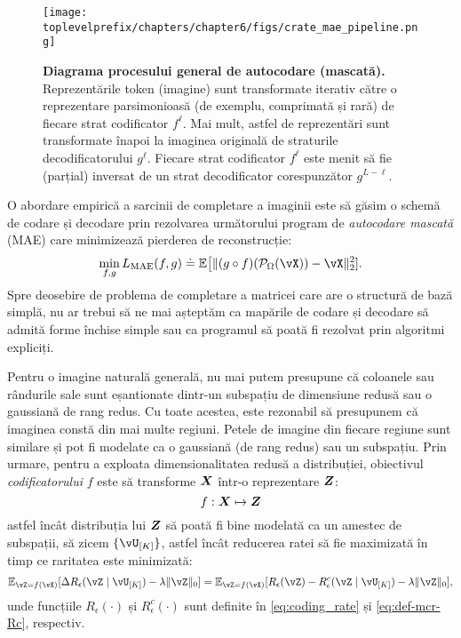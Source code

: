 \documentclass[../../book-main_ro.tex]{subfiles}
\begin{document}
\begin{figure}[t!]
\begin{center}
  \texttt{[image: \\toplevelprefix/chapters/chapter6/figs/crate\_mae\_pipeline.png]}
\end{center}
\caption{\small \textbf{Diagrama procesului general de autocodare (mascată).} Reprezentările token (imagine) sunt
  transformate iterativ către o reprezentare parsimonioasă (de exemplu, comprimată
  și rară) de fiecare strat codificator \(f^{\ell}\).
  Mai mult, astfel de reprezentări sunt transformate înapoi la
  imaginea originală de straturile decodificatorului \(g^{\ell}\). Fiecare strat codificator
  \(f^{\ell}\) este menit să fie (parțial) inversat de un
strat decodificator corespunzător \(g^{L - \ell}\).}
\label{fig:crate_mae_pipeline}
\end{figure}

O abordare empirică a sarcinii de completare a imaginii este să găsim o schemă de codare și decodare prin
rezolvarea următorului program de {\em autocodare mascată} (MAE) care
minimizează pierderea de reconstrucție:
\begin{equation}\label{eq:mae_loss}
\min_{f, g} L_{\mathrm{MAE}}(f, g) \doteq \mathbb{E}\big[\norm{(g \circ
f)(\mathcal{P}_\Omega(\vX)) - \vX}_{2}^{2}].
\end{equation}
Spre deosebire de problema de completare a matricei care are o structură
de bază simplă, nu ar trebui să ne mai așteptăm ca mapările de codare și decodare
să admită forme închise simple sau ca programul să poată fi rezolvat prin
algoritmi expliciți.

Pentru o imagine naturală generală, nu mai putem presupune că coloanele sau
rândurile sale sunt eșantionate dintr-un subspațiu de dimensiune redusă sau o
gaussiană de rang redus. Cu toate acestea, este rezonabil să presupunem că imaginea constă
din mai multe regiuni. Petele de imagine din fiecare regiune sunt similare și pot
fi modelate ca o gaussiană (de rang redus) sau un subspațiu. Prin urmare, pentru a exploata
dimensionalitatea redusă a distribuției, obiectivul \textit{codificatorului}
$f$ este să transforme $\bm{X}$ într-o reprezentare $\bm{Z}$:
\begin{equation}
    f: \bm{X} \mapsto \bm{Z}
\end{equation}
astfel încât distribuția lui $\bm{Z}$ să poată fi bine modelată ca un amestec de subspații, să zicem $\{\vU_{[K]}\}$,
astfel încât reducerea ratei să fie maximizată în timp ce raritatea este minimizată:
\begin{equation}\label{eq:sparse_rr}
\mathbb{E}_{\vZ = f(\vX)}[\Delta R_{\epsilon}(\vZ \mid \vU_{[K]}) - \lambda
\norm{\vZ}_{0}] = \mathbb{E}_{\vZ = f(\vX)}[R_\epsilon(\vZ) - R^{c}_\epsilon(\vZ \mid
\vU_{[K]}) - \lambda \norm{\vZ}_{0}],
\end{equation}
unde funcțiile $R_\epsilon(\cdot)$ și $R^c_\epsilon(\cdot)$ sunt definite în \eqref{eq:coding_rate} și \eqref{eq:def-mcr-Rc}, respectiv.
\end{document}
